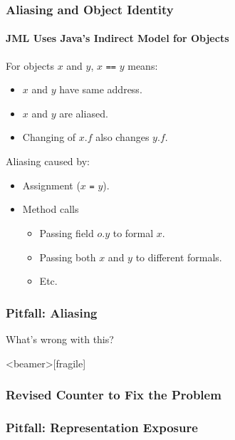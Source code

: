 \begin{frame}
\frametitle{Aliasing and Object Identity}
\framesubtitle{JML Uses Java's Indirect Model for Objects}

For objects $x$ and $y$, $x$ \texttt{==} $y$ means:
\begin{itemize}
\item
$x$ and $y$ have same address.

\item
$x$ and $y$ are aliased.

\item
Changing of $x.f$ also changes $y.f$.
\end{itemize}

Aliasing caused by:
\begin{itemize}
\item
Assignment ($x$ \texttt{=} $y$).

\item
Method calls 
\begin{itemize}
\item
Passing field $o.y$ to formal $x$.

\item
Passing both $x$ and $y$ to different formals.

\item
Etc.
\end{itemize}
\end{itemize}
\end{frame}

\begin{frame}[fragile]
\frametitle{Pitfall: Aliasing}

\begin{question}
What's wrong with this? 

\rm

\end{question}
\end{frame}

\begin{frame}<beamer>[fragile]
\frametitle{Revised Counter to Fix the Problem}


\end{frame}

\begin{frame}[fragile]
\frametitle{Pitfall: Representation Exposure}


\end{frame}


